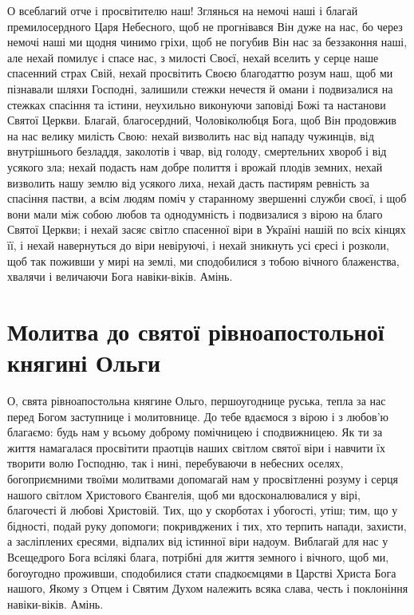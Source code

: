 \documentclass[chapters.tex]{subfiles}
\begin{document}
О всеблагий отче і просвітителю наш! Зглянься на немочі наші і благай премилосердного Царя Небесного, щоб не прогнівався Він дуже на нас, бо через немочі наші ми щодня чинимо гріхи, щоб не погубив Він нас за беззаконня наші, але нехай помилує і спасе нас, з милості Своєї, нехай вселить у серце наше спасенний страх Свій, нехай просвітить Своєю благодаттю розум наш, щоб ми пізнавали шляхи Господні, залишили стежки нечестя й омани і подвизалися на стежках спасіння та істини, неухильно виконуючи заповіді Божі та настанови Святої Церкви. Благай, благосердний, Чоловіколюбця Бога, щоб Він продовжив на нас велику милість Свою: нехай визволить нас від нападу чужинців, від внутрішнього безладдя, заколотів і чвар, від голоду, смертельних хвороб і від усякого зла; нехай подасть нам добре полиття і врожай плодів земних, нехай визволить нашу землю від усякого лиха, нехай дасть пастирям ревність за спасіння пастви, а всім людям поміч у старанному звершенні служби своєї, і щоб вони мали між собою любов та однодумність і подвизалися з вірою на благо Святої Церкви; і нехай засяє світло спасенної віри в Україні нашій по всіх кінцях її, і нехай навернуться до віри невіруючі, і нехай зникнуть усі єресі і розколи, щоб так поживши у мирі на землі, ми сподобилися з тобою вічного блаженства, хвалячи і величаючи Бога навіки-віків. Амінь.

\section{Молитва до святої рівноапостольної княгині Ольги}
О, свята рівноапостольна княгине Ольго, першоугоднице руська, тепла за нас перед Богом заступнице і молитовнице. До тебе вдаємося з вірою і з любов’ю благаємо: будь нам у всьому доброму помічницею і сподвижницею. Як ти за життя намагалася просвітити праотців наших світлом святої віри і навчити їх творити волю Господню, так і нині, перебуваючи в небесних оселях, богоприємними твоїми молитвами допомагай нам у просвітленні розуму і серця нашого світлом Христового Євангелія, щоб ми вдосконалювалися у вірі, благочесті й любові Христовій. Тих, що у скорботах і убогості, утіш; тим, що у бідності, подай руку допомоги; покривджених і тих, хто терпить напади, захисти, а засліплених єресями, відпалих від істинної віри надоум. Виблагай для нас у Всещедрого Бога всілякі блага, потрібні для життя земного і вічного, щоб ми, богоугодно проживши, сподобилися стати спадкоємцями в Царстві Христа Бога нашого, Якому з Отцем і Святим Духом належить всяка слава, честь і поклоніння навіки-віків. Амінь.
\end{document}
